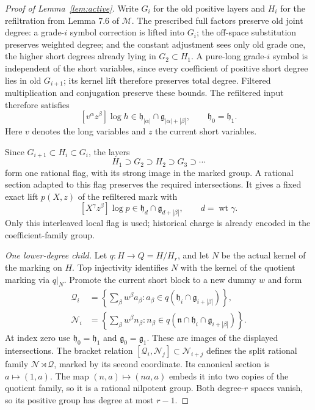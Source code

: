 \documentclass[11pt,a4paper]{article}
\theoremstyle{definition}
\newcommand{\M}{\mathcal M}
\newcommand{\g}{\mathfrak g}
\newcommand{\h}{\mathfrak h}
\newcommand{\n}{\mathfrak n}
\newcommand{\wt}{\operatorname{wt}}
\begin{document}
\begin{proof}[Proof of Lemma~\ref{lem:active}]
Write \(G_i\) for the old positive layers and \(H_i\) for
the refiltration from Lemma 7.6 of \(\M\). The prescribed
full factors preserve old joint degree: a grade-\(i\) symbol
correction is lifted into \(G_i\); the off-space substitution
preserves weighted degree; and the constant adjustment sees
only old grade one, the higher short degrees already lying
in \(G_2\subset H_1\). A pure-long grade-\(i\) symbol is independent
of the short variables, since every coefficient of positive
short degree lies in old \(G_{i+1}\); its kernel lift therefore
preserves total degree. Filtered multiplication and conjugation
preserve these bounds. The refiltered input therefore satisfies
\begin{equation}\label{eq:mixed}
 [v^\alpha z^\beta]\log h
       \in \h_{|\alpha|}\cap\g_{|\alpha|+|\beta|},
 \qquad \h_0=\h_1.
\end{equation}
Here \(v\) denotes the long variables and \(z\) the current
short variables.

Since \(G_{i+1}\subset H_i\subset G_i\), the layers
\[
 H_1\supset G_2\supset H_2\supset G_3\supset\cdots
\]
form one rational flag, with its strong image in the marked
group. A rational section adapted to this flag preserves the
required intersections. It gives a fixed exact lift \(p(X,z)\)
of the refiltered mark with
\[
 [X^\gamma z^\beta]\log p\in
       \h_d\cap\g_{d+|\beta|},\qquad d=\wt\gamma.
\]
Only this interleaved local flag is used; historical charge is
already encoded in the coefficient-family group.

\textit{One lower-degree child.}
Let \(q:H\to Q=H/H_r\), and let \(N\) be the actual
kernel of the marking on \(H\). Top injectivity identifies
\(N\) with the kernel of the quotient marking via \(q|_N\).
Promote the current short block to a new dummy \(w\) and form
\begin{align*}
 \mathcal Q_i
   &=\left\{\sum_\beta w^\beta a_\beta:
           a_\beta\in q(\h_i\cap\g_{i+|\beta|})\right\},\\
 \mathcal N_i
   &=\left\{\sum_\beta w^\beta n_\beta:
           n_\beta\in q(\n\cap\h_i\cap\g_{i+|\beta|})\right\}.
\end{align*}
At index zero use \(\h_0=\h_1\) and \(\g_0=\g_1\).
These are images of the displayed intersections.
The bracket relation
\([\mathcal Q_i,\mathcal N_j]\subset\mathcal N_{i+j}\)
defines the split rational family
\(\mathcal N\rtimes\mathcal Q\), marked by its second
coordinate. Its canonical section is \(a\mapsto(1,a)\).
The map \((n,a)\mapsto(na,a)\) embeds it into two copies of the
quotient family, so it is a rational nilpotent group.
Both degree-\(r\) spaces vanish, so its positive group has
degree at most \(r-1\).


\end{proof}
\end{document}
